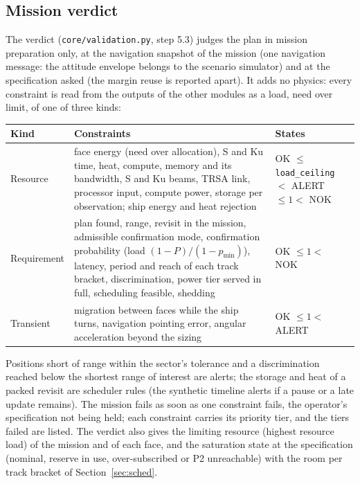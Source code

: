 \documentclass[11pt,a4paper]{article}
\newcommand{\code}[1]{\texttt{\small #1}}
\begin{document}
\subsection{Mission verdict}\label{sec:verdict}
The verdict (\code{core/validation.py}, step 5.3) judges the plan in mission preparation only, at the navigation
snapshot of the mission (one navigation message: the attitude envelope belongs to the scenario simulator) and at the
specification asked (the margin reuse is reported apart). It adds no physics: every constraint is read from the outputs
of the other modules as a load, need over limit, of one of three kinds:
\begin{center}
{\small\begin{tabularx}{\linewidth}{@{}lLl@{}}
\toprule
Kind & Constraints & States\\
\midrule
Resource & face energy (need over allocation), S and Ku time, heat, compute, memory and its bandwidth, S and Ku beams,
TRSA link, processor input, compute power, storage per observation; ship energy and heat rejection &
OK $\le$ \code{load\_ceiling} $<$ ALERT $\le 1 <$ NOK\\
Requirement & plan found, range, revisit in the mission, admissible confirmation mode, confirmation probability (load
$(1-P)/(1-p_\mathrm{min})$), latency, period and reach of each track bracket, discrimination, power tier served in
full, scheduling feasible, shedding & OK $\le 1 <$ NOK\\
Transient & migration between faces while the ship turns, navigation pointing error, angular acceleration beyond the
sizing & OK $\le 1 <$ ALERT\\
\bottomrule
\end{tabularx}}
\end{center}
Positions short of range within the sector's tolerance and a discrimination reached below the shortest range of
interest are alerts; the storage and heat of a packed revisit are scheduler rules (the synthetic timeline alerts if a
pause or a late update remains). The mission fails as soon as one constraint fails, the operator's specification not
being held; each constraint carries its priority tier, and the tiers failed are listed. The verdict also gives the
limiting resource (highest resource load) of the mission and of each face, and the saturation state at the
specification (nominal, reserve in use, over-subscribed or P2 unreachable) with the room per track bracket of
Section~\ref{sec:sched}.
\end{document}

